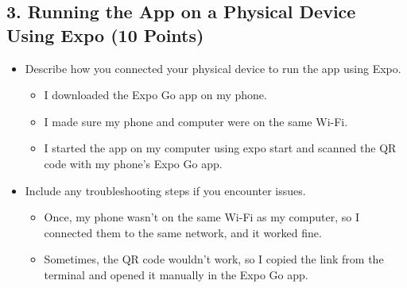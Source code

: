 \documentclass{article}
\begin{document}
\subsection*{3. Running the App on a Physical Device Using Expo (10 Points)}
\begin{itemize}
    \item Describe how you connected your physical device to run the app using Expo.

     \begin{itemize}
    
    \item I downloaded the Expo Go app on my phone.
    \item I made sure my phone and computer were on the same Wi-Fi.
    \item I started the app on my computer using expo start and scanned the QR code with my phone's Expo Go app.

    \end{itemize}
    
    \item Include any troubleshooting steps if you encounter issues.

    \begin{itemize}
    
    \item Once, my phone wasn’t on the same Wi-Fi as my computer, so I connected them to the same network, and it worked fine.

    \item Sometimes, the QR code wouldn’t work, so I copied the link from the terminal and opened it manually in the Expo Go app.

    \end{itemize}
\end{itemize}
\end{document}

